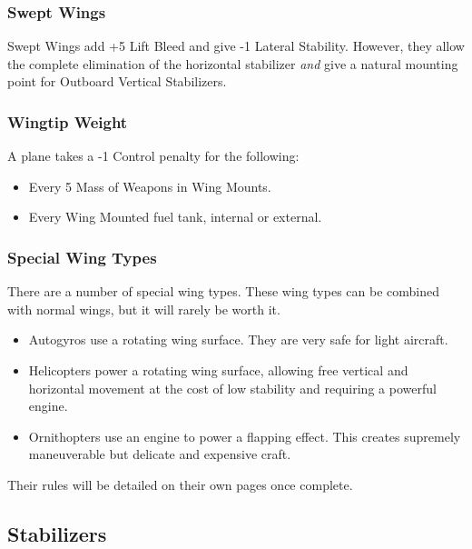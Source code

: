 \documentclass{article}
\begin{document}
\subsubsection{Swept Wings}
\label{_Swept Wings}

Swept Wings add +5 Lift Bleed and give -1 Lateral Stability. However,
they allow the complete elimination of the horizontal stabilizer
\emph{and} give a natural mounting point for Outboard Vertical
Stabilizers.

\subsubsection{Wingtip Weight}
\label{_Wingtip Weight}

A plane takes a -1 Control penalty for the following:

\begin{itemize}
  \item          Every 5 Mass of Weapons in Wing Mounts.
  \item          Every Wing Mounted fuel tank, internal or external.
\end{itemize}

\subsubsection{Special Wing Types}
\label{_Special Wing Types}

There are a number of special wing types. These wing types can be
combined with normal wings, but it will rarely be worth it.

\begin{itemize}
  \item          Autogyros use a rotating wing surface. They are very safe for
        light aircraft.
  \item          Helicopters power a rotating wing surface, allowing free
        vertical and horizontal movement at the cost of low stability and
        requiring a powerful engine.
  \item          Ornithopters use an engine to power a flapping effect. This
        creates supremely maneuverable but delicate and expensive craft.
\end{itemize}

Their rules will be detailed on their own pages once complete.

\subsection{Stabilizers}
\label{_Stabilizers}
\end{document}
